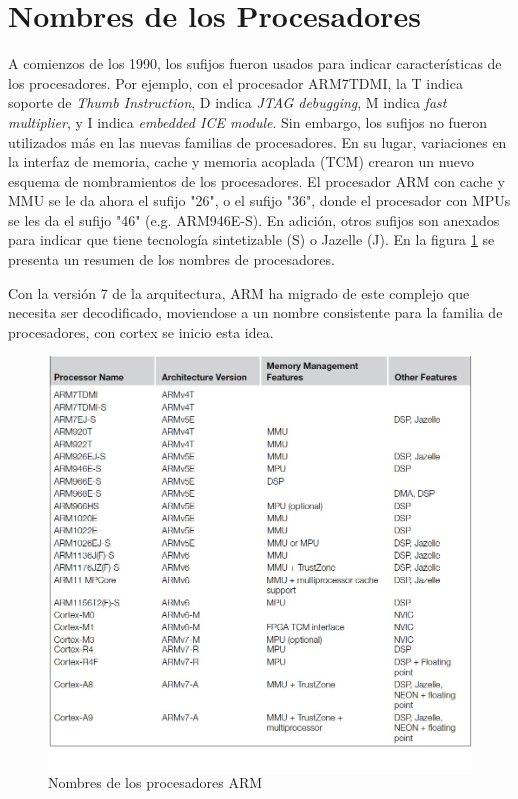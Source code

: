 \documentclass[12pt]{book}
\theoremstyle{definition}
\theoremstyle{remark}
\theoremstyle{plain}
\begin{document}
\section{Nombres de los Procesadores}
A comienzos de los 1990, los sufijos fueron usados para indicar características de los procesadores. Por ejemplo, con el procesador ARM7TDMI, la T indica soporte de \emph{Thumb Instruction}, D indica \emph{JTAG debugging}, M indica \emph{fast multiplier}, y I indica \emph{embedded ICE module}. Sin embargo, los sufijos no fueron utilizados más en las nuevas familias de procesadores. En su lugar, variaciones en la interfaz de memoria, cache y memoria acoplada (TCM) crearon un nuevo esquema de nombramientos de los procesadores.
El procesador ARM con cache y MMU se le da ahora el sufijo "26", o el sufijo "36", donde el procesador con MPUs se les da el sufijo "46" (e.g. ARM946E-S). En adición, otros sufijos son anexados para indicar que tiene tecnología  sintetizable (S) o Jazelle (J). En la figura \ref{fig2}  se presenta un resumen de los nombres de procesadores. 


Con la versión 7 de la arquitectura, ARM ha migrado de este complejo que necesita ser decodificado, moviendose a un nombre consistente para la familia de procesadores, con cortex se inicio esta idea.

\begin{figure}
\centering
\includegraphics[width=5in]{Nombres.jpg}
\caption{Nombres de los procesadores ARM}
\label{fig2}
\end{figure}
\end{document}
